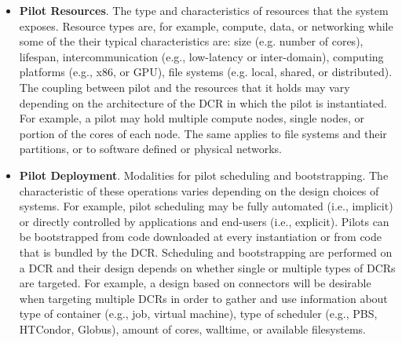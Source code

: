 \documentclass{sig-alternate}
\begin{document}
\begin{itemize}

\item \textbf{Pilot Resources}. The type and characteristics of resources that
  the \pilot system exposes. Resource types are, for example, compute, data, or
  networking while some of the their typical characteristics are: size (e.g.
  number of cores), lifespan, intercommunication (e.g., low-latency or
  inter-domain), computing platforms (e.g., x86, or GPU), file systems (e.g.
  local, shared, or distributed). The coupling between pilot and the resources
  that it holds may vary depending on the architecture of the DCR in which the
  pilot is instantiated. For example, a pilot may hold multiple compute nodes,
  single nodes, or portion of the cores of each node. The same applies to file
  systems and their partitions, or to software defined or physical networks.



\item \textbf{Pilot Deployment}. Modalities for pilot scheduling and
  bootstrapping. The characteristic of these operations varies depending on the
  design choices of \pilot systems. For example, pilot scheduling may be fully
  automated (i.e., implicit) or directly controlled by applications and
  end-users (i.e., explicit). Pilots can be bootstrapped from code downloaded at
  every instantiation or from code that is bundled by the DCR. Scheduling and
  bootstrapping are performed on a DCR and their design depends on whether
  single or multiple types of DCRs are targeted. For example, a design based on
  connectors will be desirable when targeting multiple DCRs in order to gather
  and use information about type of container (e.g., job, virtual machine), type
  of scheduler (e.g., PBS, HTCondor, Globus), amount of cores, walltime, or
  available filesystems.




\end{itemize}
\end{document}
